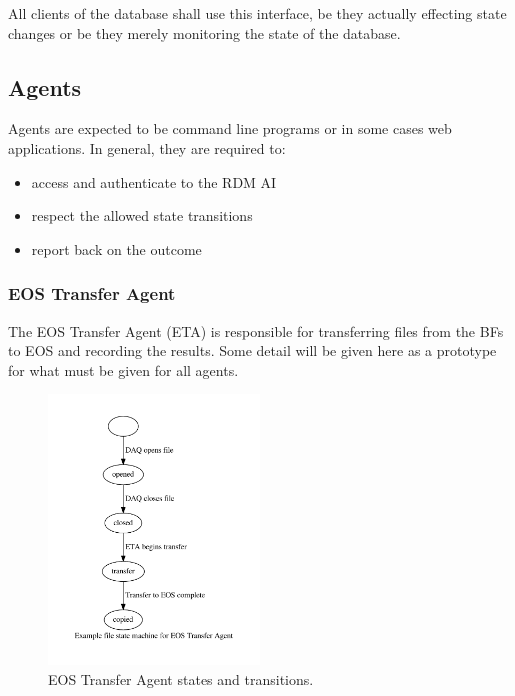 \documentclass[pdftex,12pt,letter]{article}
\begin{document}
All clients of the database shall use this interface, be they actually
effecting state changes or be they merely monitoring the state of the
database.

\subsection{Agents}
\label{subsec:agents}

Agents are expected to be command line programs or in some cases web
applications.  In general, they are required to:

\begin{itemize}
\item access and authenticate to the RDM AI
\item respect the allowed state transitions
\item report back on the outcome
\end{itemize}



\subsubsection{EOS Transfer Agent}
\label{subsec:eosxferagent}

The EOS Transfer Agent (ETA) is responsible for transferring files
from the BFs to EOS and recording the results.  Some detail will be
given here as a prototype for what must be given for all agents.

\begin{figure}[h]
  \centering
  \includegraphics[width=0.5\textwidth]{state.pdf}
  \caption{EOS Transfer Agent states and transitions.}
  \label{fig:state}
\end{figure}
\end{document}
